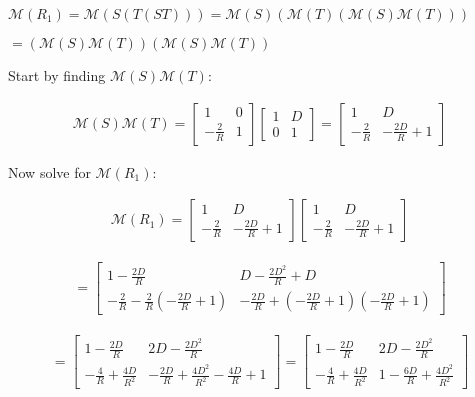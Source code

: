 \documentclass[fleqn]{article}
\begin{document}
\begin{enumerate}[nolistsep]
			$\mathcal{M}(R_1) = \mathcal{M}(S(T(ST))) = \mathcal{M}(S)(\mathcal{M}(T)(\mathcal{M}(S)\mathcal{M}(T)))$
			
			$ = (\mathcal{M}(S)\mathcal{M}(T))(\mathcal{M}(S)\mathcal{M}(T))$
			
			Start by finding $\mathcal{M}(S)\mathcal{M}(T)$:
			
			\begin{align*}
				\mathcal{M}(S)\mathcal{M}(T) = \begin{bmatrix} 1 & 0\\ -\frac{2}{R} & 1 \end{bmatrix} \begin{bmatrix}1 & D\\ 0 & 1\end{bmatrix} = \begin{bmatrix}1 & D\\ -\frac{2}{R} & -\frac{2D}{R} + 1\end{bmatrix}
			\end{align*}
			
			Now solve for $\mathcal{M}(R_1)$:
			
			\begin{align*}
				\mathcal{M}(R_1) = \begin{bmatrix}1 & D\\ -\frac{2}{R} & -\frac{2D}{R} + 1\end{bmatrix}\begin{bmatrix}1 & D\\ -\frac{2}{R} & -\frac{2D}{R} + 1\end{bmatrix}
			\end{align*}
			
			\vspace{-12pt}
			
			\begin{align*}
				= \begin{bmatrix}1 - \frac{2D}{R} & D - \frac{2D^2}{R} + D\\ -\frac{2}{R} - \frac{2}{R}(-\frac{2D}{R} + 1) & -\frac{2D}{R} + (-\frac{2D}{R}+1)(-\frac{2D}{R}+1)\end{bmatrix}
			\end{align*}
			
			\vspace{-12pt}
			
			\begin{align*}
				= \begin{bmatrix}1 - \frac{2D}{R} & 2D - \frac{2D^2}{R}\\ -\frac{4}{R} +\frac{4D}{R^2} & -\frac{2D}{R} + \frac{4D^2}{R^2} -\frac{4D}{R} + 1\end{bmatrix} = \begin{bmatrix}1 - \frac{2D}{R} & 2D - \frac{2D^2}{R}\\ -\frac{4}{R} + \frac{4D}{R^2} & 1 - \frac{6D}{R} + \frac{4D^2}{R^2}\end{bmatrix}
			\end{align*}
			

\end{enumerate}
\end{document}
